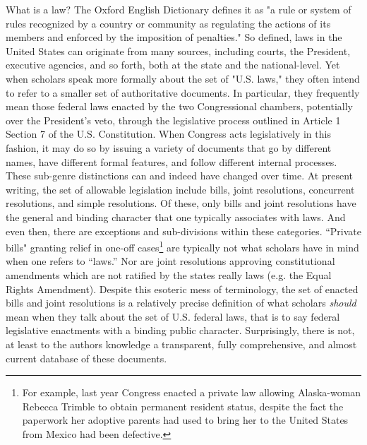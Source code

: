 \documentclass[fleqn,10pt]{wlscirep}
\begin{document}
What is a law? The Oxford English Dictionary defines it as "a rule or system of rules recognized by a country or community as regulating the actions of its members and enforced by the imposition of penalties." \cite{law2008} So defined, laws in the United States can originate from many sources, including courts, the President, executive agencies, and so forth, both at the state and the national-level. Yet when scholars speak more formally about the set of "U.S. laws," they often intend to refer to a smaller set of authoritative documents. In particular, they frequently mean those federal laws enacted by the two Congressional chambers, potentially over the President's veto, through the legislative process outlined in Article 1 Section 7 of the U.S. Constitution. When Congress acts legislatively in this fashion, it may do so by issuing a variety of documents that go by different names, have different formal features, and follow different internal processes. These sub-genre distinctions can and indeed have changed over time. At present writing, the set of allowable legislation include bills, joint resolutions, concurrent resolutions, and simple resolutions. Of these, only bills and joint resolutions have the general and binding character that one typically associates with laws. And even then, there are exceptions and sub-divisions within these categories. ``Private bills" granting relief in one-off cases\footnote{For example, last year Congress enacted a private law allowing Alaska-woman Rebecca Trimble to obtain permanent resident status, despite the fact the paperwork her adoptive parents had used to bring her to the United States from Mexico had been defective.} are typically not what scholars have in mind when one refers to ``laws.'' Nor are joint resolutions approving constitutional amendments which are not ratified by the states really laws (e.g. the Equal Rights Amendment). Despite this esoteric mess of terminology, the set of enacted bills and joint resolutions is a relatively precise definition of what scholars \textit{should} mean when they talk about the set of U.S. federal laws, that is to say federal legislative enactments with a binding public character. Surprisingly, there is not, at least to the authors knowledge a transparent, fully comprehensive, and almost current database of these documents.
\end{document}
